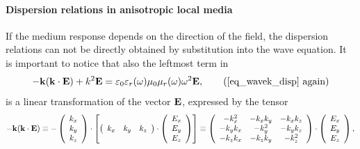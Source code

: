 \paragraph{Dispersion relations in anisotropic local media}  %
If the medium response depends on the direction of the field, the dispersion relations can not be directly obtained by substitution into the wave equation. 
It is important to notice that also the leftmost term in 
\begin{equation} - \kk (\kk \cdot \E) + k^2 \E = \varepsilon_0 \epsrl(\omega) \mu_0 \murl(\omega) \omega^{2} \E, \tag{\ref{eq_wavek_disp} \again} \end{equation}
is a linear transformation of the vector $\mathbf{E}$, expressed by the tensor
$$ - {\mathbf{k}} ({\mathbf{k}} \cdot \mathbf{E}) \equiv 
	-\left(\begin{array}{c} k_x \\ k_y \\ k_z \end{array} \right) \cdot
	\left[\left(\begin{array}{ccc} k_x & k_y & k_z \end{array} \right) \cdot
	\left(\begin{array}{c} E_x \\ E_y \\ E_z \end{array} \right)\right] 
		\equiv
	\left(\begin{array}{ccc} -k_x^2 & -k_x k_y & -k_x k_z \\ -k_y k_x & -k_y^2 & -k_y k_z \\ -k_z k_x & -k_z k_y & -k_z^2 \end{array} \right) \cdot  
	\left(\begin{array}{c} E_x \\ E_y \\ E_z \end{array} \right),
	$$
